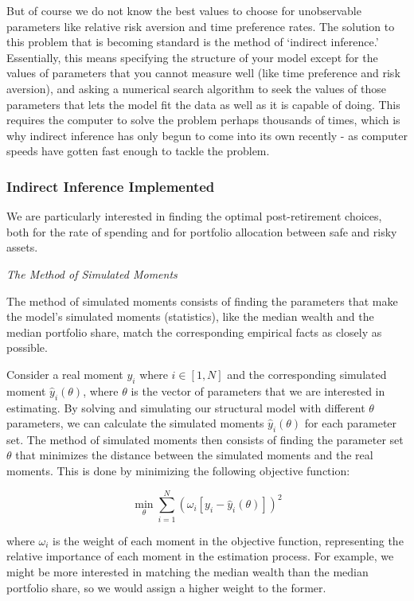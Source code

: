 \documentclass{article}
\begin{document}
But of course we do not know the best values to choose for unobservable parameters like relative risk aversion and time preference rates. The solution to this problem that is becoming standard is the method of `indirect inference.' Essentially, this means specifying the structure of your model except for the values of parameters that you cannot measure well (like time preference and risk aversion), and asking a numerical search algorithm to seek the values of those parameters that lets the model fit the data as well as it is capable of doing. This requires the computer to solve the problem perhaps thousands of times, which is why indirect inference has only begun to come into its own recently - as computer speeds have gotten fast enough to tackle the problem.

\subsubsection{Indirect Inference Implemented}

We are particularly interested in finding the optimal post-retirement choices, both for the rate of spending and for portfolio allocation between safe and risky assets.

\textit{The Method of Simulated Moments}

The method of simulated moments consists of finding the parameters that make the model's simulated moments (statistics), like the median wealth and the median portfolio share, match the corresponding empirical facts as closely as possible.

Consider a real moment $y_i$ where $i \in [1, N]$ and the corresponding simulated moment $\hat{y}_i(\theta)$, where $\theta$ is the vector of parameters that we are interested in estimating. By solving and simulating our structural model with different $\theta$ parameters, we can calculate the simulated moments $\hat{y}_i(\theta)$ for each parameter set. The method of simulated moments then consists of finding the parameter set $\theta$ that minimizes the distance between the simulated moments and the real moments. This is done by minimizing the following objective function:

\begin{equation}
\min_{\theta} \sum_{i=1}^{N}  \left( \omega_i [y_i - \hat{y}_i(\theta) ] \right)^2
\end{equation}

where $\omega_i$ is the weight of each moment in the objective function, representing the relative importance of each moment in the estimation process. For example, we might be more interested in matching the median wealth than the median portfolio share, so we would assign a higher weight to the former.
\end{document}
